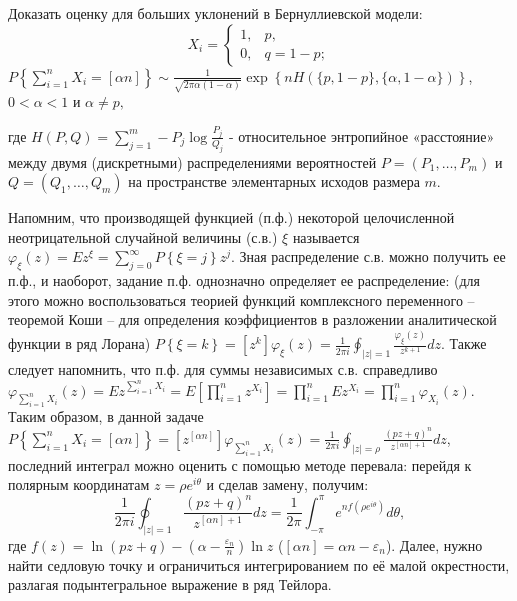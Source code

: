 \begin{problem}

Доказать оценку для больших уклонений в Бернуллиевской модели:
\[X_{i} =\left\{\begin{array}{cc} {1,} & {p,} \\ {0,} & {q=1-p;} \end{array}\right. \] 
$P\left\{\sum _{i=1}^{n}X_{i} =\left[\alpha n\right] \right\}\sim \frac{1}{\sqrt{2\pi \alpha (1-\alpha )} } \exp \left\{nH(\{ p,1-p\} ,\{ \alpha ,1-\alpha \} )\right\}$, $0<\alpha <1$ и $\alpha \ne p,$

\noindent где $H\left(P,Q\right)=\sum _{j=1}^{m}-P_{j} \log \frac{P_{j} }{Q_{j} }  $ - относительное энтропийное «расстояние» между двумя (дискретными) распределениями вероятностей $P=\left(P_{1} ,\ldots ,P_{m} \right)$ и $Q=\left(Q_{1} ,\ldots ,Q_{m} \right)$ на пространстве элементарных исходов размера $m$.

\begin{ordre}

Напомним, что производящей функцией (п.ф.) некоторой целочисленной неотрицательной случайной величины (с.в.) $\xi $ называется $\varphi _{\xi } (z)=Ez^{\xi } =\sum _{j=0}^{\infty }P\left\{\xi =j\right\} z^{j} $. Зная распределение с.в. можно получить ее п.ф., и наоборот, задание п.ф. однозначно определяет ее распределение: (для этого можно воспользоваться теорией функций комплексного переменного -- теоремой Коши -- для определения коэффициентов в разложении аналитической функции в ряд Лорана) $P\left\{\xi =k\right\}=\left[z^{k} \right]\varphi _{\xi } (z)=\frac{1}{2\pi i} \oint _{\left|z\right|=1}\frac{\varphi _{\xi } (z)}{z^{k+1} } dz $. Также следует напомнить, что п.ф. для суммы независимых с.в. справедливо $\varphi _{\sum _{i=1}^{n}X_{i}  } (z)=Ez^{\sum _{i=1}^{n}X_{i}  } =E\left[\prod _{i=1}^{n}z^{X_{i} }  \right]=\prod _{i=1}^{n}Ez^{X_{i} }  =\prod _{i=1}^{n}\varphi _{X_{i} } (z) $. Таким образом, в данной задаче $P\left\{\sum _{i=1}^{n}X_{i} =\left[\alpha n\right] \right\}=\left[z^{\left[\alpha n\right]} \right]\varphi _{\sum _{i=1}^{n}X_{i}  } (z)=\frac{1}{2\pi i} \oint _{\left|z\right|=\rho }\frac{\left(pz+q\right)^{n} }{z^{\left[\alpha n\right]+1} } dz $,\textbf{ }последний интеграл можно оценить с помощью методе перевала: перейдя к полярным координатам $z=\rho e^{i\theta } $ и сделав замену, получим:\textbf{}
\[\frac{1}{2\pi i} \oint _{\left|z\right|=1}\frac{\left(pz+q\right)^{n} }{z^{\left[\alpha n\right]+1} } dz =\frac{1}{2\pi } \int _{-\pi }^{\pi }e^{nf\left(\rho e^{i\theta } \right)} d\theta  ,\] 
где $f(z)=\ln \left(pz+q\right)-\left(\alpha -\frac{\varepsilon _{n} }{n} \right)\ln z$ ($\left[\alpha n\right]=\alpha n-\varepsilon _{n} $). Далее, нужно найти седловую точку и ограничиться интегрированием по её малой окрестности, разлагая подынтегральное выражение в ряд Тейлора.

\end{ordre}

\end{problem}